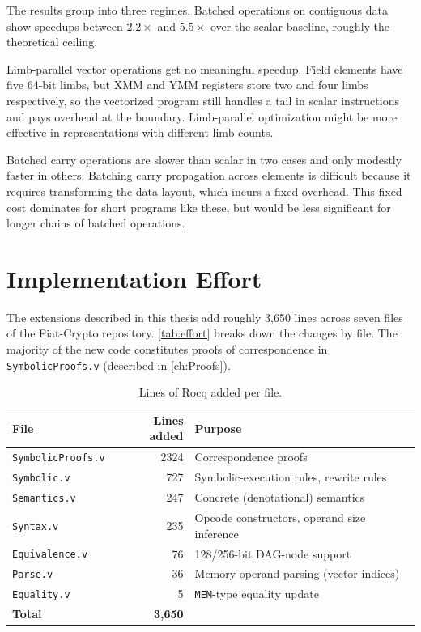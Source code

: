 The results group into three regimes.
Batched operations on contiguous data show speedups between $2.2\times$ and $5.5\times$ over the scalar baseline, roughly the theoretical ceiling.

Limb-parallel vector operations get no meaningful speedup. Field elements have five 64-bit limbs, but XMM and YMM registers store two and four limbs respectively, so the vectorized program still handles a tail in scalar instructions and pays overhead at the boundary. Limb-parallel optimization might be more effective in representations with different limb counts.

Batched carry operations are slower than scalar in two cases and only modestly faster in others. Batching carry propagation across elements is difficult because it requires transforming the data layout, which incurs a fixed overhead. This fixed cost dominates for short programs like these, but would be less significant for longer chains of batched operations.


\section{Implementation Effort}
\label{sec:impl-effort}

The extensions described in this thesis add roughly 3{,}650 lines across seven files of the Fiat-Crypto repository.
\autoref{tab:effort} breaks down the changes by file.
The majority of the new code constitutes proofs of correspondence in \texttt{SymbolicProofs.v} (described in \autoref{ch:Proofs}).

\begin{table}[h]
\centering
\begin{tabular}{lrl}
\toprule
\textbf{File} & \textbf{Lines added} & \textbf{Purpose} \\
\midrule
\texttt{SymbolicProofs.v} & 2324 & Correspondence proofs \\
\texttt{Symbolic.v}       &  727 & Symbolic-execution rules, rewrite rules \\
\texttt{Semantics.v}      &  247 & Concrete (denotational) semantics \\
\texttt{Syntax.v}         &  235 & Opcode constructors, operand size inference \\
\texttt{Equivalence.v}    &   76 & 128/256-bit DAG-node support \\
\texttt{Parse.v}          &   36 & Memory-operand parsing (vector indices) \\
\texttt{Equality.v}       &    5 & \texttt{MEM}-type equality update \\
\midrule
\textbf{Total}            & \textbf{3,650} & \\
\bottomrule
\end{tabular}
\caption{Lines of Rocq added per file.}
\label{tab:effort}
\end{table}





